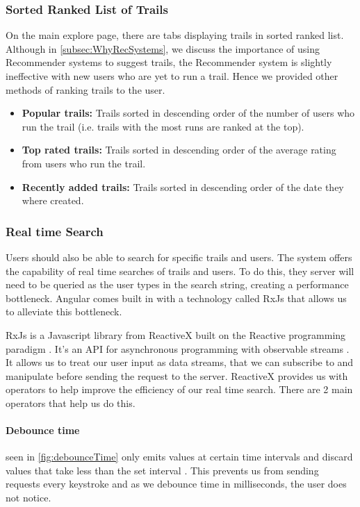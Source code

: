 \subsubsection{Sorted Ranked List of Trails}
On the main explore page, there are tabs displaying trails in sorted ranked list. Although in \autoref{subsec:WhyRecSystems}, we discuss the importance of using Recommender systems to suggest trails, the Recommender system is slightly ineffective with new users who are yet to run a trail. Hence we provided other methods of ranking trails to the user.

\begin{itemize}
    \item \textbf{Popular trails:} Trails sorted in descending order of the number of users who run the trail (i.e. trails with the most runs are ranked at the top). 
    \item \textbf{Top rated trails:} Trails sorted in descending order of the average rating from users who run the trail.
    \item \textbf{Recently added trails:} Trails sorted in descending order of the date they where created.
\end{itemize}

\subsubsection{Real time Search}
Users should also be able to search for specific trails and users. The system offers the capability of real time searches of trails and users. To do this, they server will need to be queried as the user types in the search string, creating a performance bottleneck. Angular comes built in with a technology called RxJs that allows us to alleviate this bottleneck.

RxJs is a Javascript library from ReactiveX built on the Reactive programming paradigm \cite{wan2000functional}. It's an API for asynchronous programming with observable streams \cite{reactivex2018main}. It allows us to treat our user input as data streams, that we can subscribe to and manipulate before sending the request to the server. ReactiveX provides us with operators to help improve the efficiency of our real time search. There are 2 main operators that help us do this.

\paragraph{Debounce time} seen in \autoref{fig:debounceTime} only emits values at certain time intervals and discard values that take less than the set interval \cite{leanrrxjs2019debounce}. This prevents us from sending requests every keystroke and as we debounce time in milliseconds, the user does not notice.


